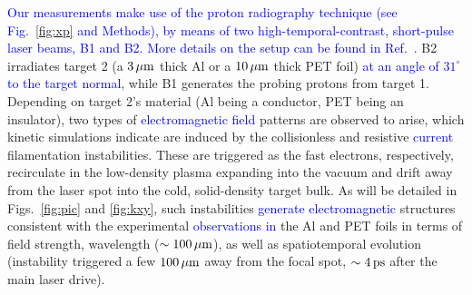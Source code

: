 \documentclass[aps,twocolumn,showpacs,superscriptaddress]{revtex4}
\begin{document}
\textcolor{blue}{Our measurements make use of the proton radiography technique (see Fig.~\ref{fig:xp} and Methods), by means of two high-temporal-contrast, short-pulse laser beams, B1 and B2. More details on the setup can be found in Ref.~\cite{RSI_Albertazzi_2015}.} B2 irradiates target 2 (a $3\,\rm \mu m$ thick Al or a $10\,\rm \mu m$ thick PET foil) \textcolor{blue}{at an angle of $31^\circ$ to the target normal}, while B1 generates the probing protons from target 1. Depending on target 2's material (Al being a conductor, PET being an insulator), two types of \textcolor{blue}{electromagnetic field} patterns are observed to arise, which kinetic simulations indicate are induced by the collisionless and resistive \textcolor{blue}{current} filamentation instabilities. These are triggered as the fast electrons, respectively, recirculate in the low-density plasma expanding into the vacuum and drift away from the laser spot into the cold, solid-density target bulk. As will be detailed in Figs.~\ref{fig:pic} and \ref{fig:kxy}, such instabilities \textcolor{blue}{generate electromagnetic} structures consistent with the experimental \textcolor{blue}{observations in} the Al and PET foils in terms of field strength, wavelength ($\sim 100\,\rm \mu m$), as well as spatiotemporal evolution (instability triggered a few $100\,\rm \mu m$ away from the focal spot, $\sim 4\,\rm ps$ after the main laser drive).
%
\end{document}
